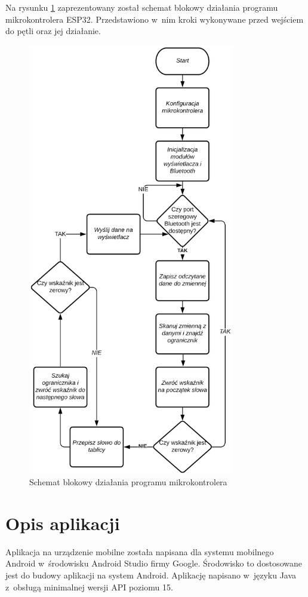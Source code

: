 \documentclass[a4paper,12pt, twoside]{article}
\begin{document}
    	Na rysunku \ref{fig:petlamikrokontrolera} zaprezentowany został schemat blokowy działania programu mikrokontrolera ESP32. Przedstawiono w~nim kroki wykonywane przed wejściem do pętli oraz jej działanie.
    	\begin{figure}[H]
    	        \centering
    			\includegraphics[width=9cm]{images/schemat_petli_mikrokontrolera.png}
    			\caption{Schemat blokowy działania programu mikrokontrolera}
                \label{fig:petlamikrokontrolera}
    	\end{figure}
    	
    	\section{Opis aplikacji}
    	Aplikacja na urządzenie mobilne została napisana dla systemu mobilnego Android w~środowisku Android Studio firmy Google. Środowisko to dostosowane jest do budowy aplikacji na system Android. Aplikację napisano w~języku Java z~obsługą minimalnej wersji API poziomu 15.
    	
\end{document}
